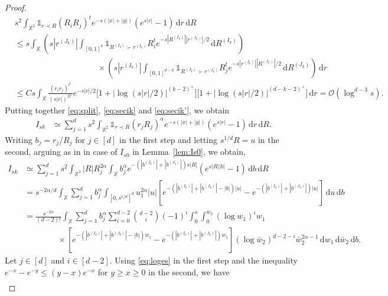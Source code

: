 \documentclass[11pt,reqno]{amsart}
\numberwithin{equation}{section}
\theoremstyle{definition}
\newcommand{\XX}{\mathbb{X}}
\newcommand{\diff}{{\,\mathrm d}}
\begin{document}
\begin{proof}
	\begin{align}\label{eq:secik'}
		&s^2 \int_{\XX^2} \mathds{1}_{r \prec R} (R_i R_j)^{t}  e^{-s(|x|+|y|)} (e^{s|r|}-1) \diff r \diff R\nonumber\\
		&\le s \int_\XX \left(s|r^{(J_k)}| \int_{[0,1]^{k}} \mathds{1}_{R^{(I_k)} \succ r^{(I_k)}} R_i^{t} e^{-s|R^{(I_k)}||r^{(J_k)}|/2} \diff R^{(I_k)}\right)  \nonumber\\
		& \qquad\qquad\qquad\qquad\qquad \times \left(s|r^{(I_k)}| \int_{[0,1]^{d-k}} \mathds{1}_{R^{(J_k)} \succ r^{(J_k)}} R_j^t e^{-s|r^{(I_k)}||R^{(J_k)}|/2} \diff R^{(J_k)}\right) \diff r\nonumber\\
		& \le C s \int_\XX \frac{(r_ir_j)^{t'}}{(s|r|)^{2t'}} e^{-s|r|/2} \Big[1+\big|\log(s|r|/2)\big|^{(k-2)^+}\Big] \Big[1+\big|\log(s|r|/2)\big|^{(d-k-2)^+}\Big]\diff r = \mathcal{O}(\log^{d-3} s).
	\end{align}
	Putting together \eqref{eq:split}, \eqref{eq:secik} and \eqref{eq:secik'}, we obtain
	\begin{align*}
		I_{sk} & \simeq 
		\sum_{j=1}^d s^2 \int_{\XX^2}\mathds{1}_{r \prec R} (r_jR_j)^{\alpha} e^{-s(|x|+|y|)} (e^{s|r|}-1) \diff r \diff R.
	\end{align*}
	Writing $b_j=r_j/R_j$ for $j \in [d]$ in the first step and letting $s^{1/d} R=u$ in the second, arguing as in in case of $I_{s0}$ in Lemma~\ref{lem:Is0}, we obtain,
	\begin{align}\label{eq:Is1}
		I_{sk}
		&\simeq \sum_{j=1}^d s^2 \int_{\XX^2} |R| R_j^{2\alpha} \int_{\XX}b_j^{\alpha} e^{-(|b^{(I_k)}| + |b^{(J_k)}|)s|R|} (e^{s|R||b|}-1) \diff b \diff R\nonumber\\
		& = s^{-2\alpha/d} \int_\XX \sum_{j=1}^d b_j^{\alpha}  \int_{[0,s^{1/d}]^d} u_1^{2\alpha}|u| \left[e^{-(|b^{(I_k)}| + |b^{(J_k)}|-|b|)|u|} - e^{-(|b^{(I_k)}| + |b^{(J_k)}|)|u|} \right]\diff u \diff b\nonumber\\
		&=\frac{s^{-2\alpha}}{(d-2)!} \int_{\XX } \sum_{j=1}^d b_j^{\alpha} \sum_{i=0}^{d-2} \binom{d-2}{i} (-1)^i  \int_0^s \int_{0}^{\bar w_2} (\log w_1)^i w_1 \nonumber\\
		& \qquad \qquad \times \left[e^{-(|b^{(I_k)}| + |b^{(J_k)}|-|b|)w_1} - e^{-(|b^{(I_k)}| + |b^{(J_k)}|)w_1} \right] (\log \bar w_2)^{d-2-i}  \bar w_2^{2\alpha-1}  \diff w_1 \diff \bar w_2  \diff b.
	\end{align}
	Let $j \in [d]$ and $i \in [d-2]$. Using \eqref{eq:loges} in the first step and the inequality $e^{-x}-e^{-y} \le (y-x)e^{-x}$ for $y \ge x \ge 0$ in the second, we have
	\begin{align}\label{eq:Is2}

\end{align}
\end{proof}
\end{document}
